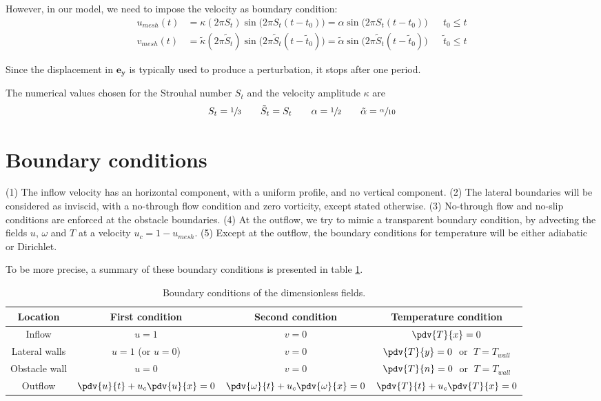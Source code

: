 \documentclass[11 pt]{article}
\begin{document}
However, in our model, we need to impose the velocity as boundary condition:
\begin{equation}
\begin{aligned}
    u_{mesh}(t) &= \kappa (2\pi S_t) \sin{\big(2\pi S_t (t - t_0)\big)} = \alpha \sin{\big(2\pi S_t (t - t_0)\big)} && t_0 \leq t\\
    v_{mesh}(t) &= \tilde \kappa (2\pi \tilde S_t ) \sin{\big(2\pi \tilde S_t (t - \tilde t_0)\big)} = \tilde \alpha \sin{\big(2\pi \tilde S_t (t - \tilde t_0)\big)} && \tilde t_0 \leq t
\end{aligned}
\end{equation}

Since the displacement in $\mathbf{e_y}$ is typically used to produce a perturbation, it stops after one period. 

The numerical values chosen for the Strouhal number $S_t$ and the velocity amplitude $\kappa$ are
\begin{equation}
    S_t = \sfrac{1}{3} \qquad \tilde S_t = S_t \qquad \alpha = \sfrac{1}{2} \qquad \tilde \alpha = \sfrac{\alpha}{10}
\end{equation}


\section{Boundary conditions}
(1) The inflow velocity has an horizontal component, with a uniform profile, and no vertical component. (2) The lateral boundaries will be considered as inviscid, with a no-through flow condition and zero vorticity, except stated otherwise. (3) No-through flow and no-slip conditions are enforced at the obstacle boundaries. (4) At the outflow, we try to mimic a transparent boundary condition, by advecting the fields $u$, $\omega$ and $T$ at a velocity $u_c = 1-u_{mesh}$. (5) Except at the outflow, the boundary conditions for temperature will be either adiabatic or Dirichlet.

To be more precise, a summary of these boundary conditions is presented in table \ref{tab:boundary}.
\begin{table}[H]
    \centering
    \begin{tabularx}{\textwidth}{@{\extracolsep{\stretch{1}}}*{4}{c}@{}}
    \toprule
    Location & First condition & Second condition & Temperature condition\\
    \midrule
    Inflow & $u=1$ & $v=0$ & $\pdv{T}{x} = 0$\\[8pt]
    Lateral walls & $u=1$ (or $u=0$) & $v=0$ & $\pdv{T}{y} = 0\;$ or $\;T=T_{wall}$\\[8pt]
    Obstacle wall & $u=0$ & $v=0$ & $\pdv{T}{n} = 0\;$ or $\;T=T_{wall}$\\[8pt]
    Outflow & $\pdv{u}{t} + u_c \pdv{u}{x} = 0$ & $\pdv{\omega}{t} + u_c \pdv{\omega}{x} = 0$ & $\pdv{T}{t} + u_c \pdv{T}{x} = 0$ \\
    \bottomrule
    \end{tabularx}
    \caption{Boundary conditions of the dimensionless fields.}
    \label{tab:boundary}
\end{table}
\end{document}
